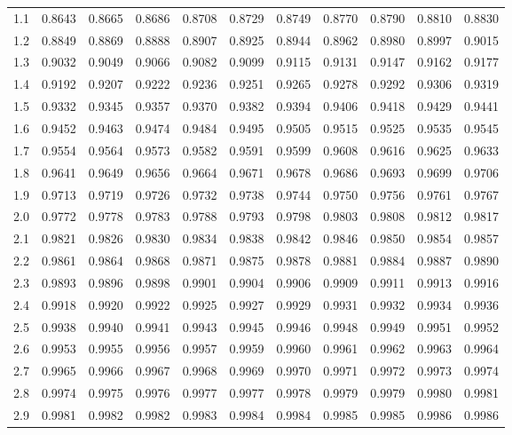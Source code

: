 \documentclass[12pt,a4paper]{article}
\begin{document}
\begin{enumerate}
\begin{center}
\begin{longtable}{ccccccccccc}
1.1 & 0.8643 & 0.8665 & 0.8686 & 0.8708 & 0.8729 & 0.8749 & 0.8770 & 0.8790 & 0.8810 & 0.8830 \\
1.2 & 0.8849 & 0.8869 & 0.8888 & 0.8907 & 0.8925 & 0.8944 & 0.8962 & 0.8980 & 0.8997 & 0.9015 \\
1.3 & 0.9032 & 0.9049 & 0.9066 & 0.9082 & 0.9099 & 0.9115 & 0.9131 & 0.9147 & 0.9162 & 0.9177 \\
1.4 & 0.9192 & 0.9207 & 0.9222 & 0.9236 & 0.9251 & 0.9265 & 0.9278 & 0.9292 & 0.9306 & 0.9319 \\
1.5 & 0.9332 & 0.9345 & 0.9357 & 0.9370 & 0.9382 & 0.9394 & 0.9406 & 0.9418 & 0.9429 & 0.9441 \\
1.6 & 0.9452 & 0.9463 & 0.9474 & 0.9484 & 0.9495 & 0.9505 & 0.9515 & 0.9525 & 0.9535 & 0.9545 \\
1.7 & 0.9554 & 0.9564 & 0.9573 & 0.9582 & 0.9591 & 0.9599 & 0.9608 & 0.9616 & 0.9625 & 0.9633 \\
1.8 & 0.9641 & 0.9649 & 0.9656 & 0.9664 & 0.9671 & 0.9678 & 0.9686 & 0.9693 & 0.9699 & 0.9706 \\
1.9 & 0.9713 & 0.9719 & 0.9726 & 0.9732 & 0.9738 & 0.9744 & 0.9750 & 0.9756 & 0.9761 & 0.9767 \\
2.0 & 0.9772 & 0.9778 & 0.9783 & 0.9788 & 0.9793 & 0.9798 & 0.9803 & 0.9808 & 0.9812 & 0.9817 \\
2.1 & 0.9821 & 0.9826 & 0.9830 & 0.9834 & 0.9838 & 0.9842 & 0.9846 & 0.9850 & 0.9854 & 0.9857 \\
2.2 & 0.9861 & 0.9864 & 0.9868 & 0.9871 & 0.9875 & 0.9878 & 0.9881 & 0.9884 & 0.9887 & 0.9890 \\
2.3 & 0.9893 & 0.9896 & 0.9898 & 0.9901 & 0.9904 & 0.9906 & 0.9909 & 0.9911 & 0.9913 & 0.9916 \\
2.4 & 0.9918 & 0.9920 & 0.9922 & 0.9925 & 0.9927 & 0.9929 & 0.9931 & 0.9932 & 0.9934 & 0.9936 \\
2.5 & 0.9938 & 0.9940 & 0.9941 & 0.9943 & 0.9945 & 0.9946 & 0.9948 & 0.9949 & 0.9951 & 0.9952 \\
2.6 & 0.9953 & 0.9955 & 0.9956 & 0.9957 & 0.9959 & 0.9960 & 0.9961 & 0.9962 & 0.9963 & 0.9964 \\
2.7 & 0.9965 & 0.9966 & 0.9967 & 0.9968 & 0.9969 & 0.9970 & 0.9971 & 0.9972 & 0.9973 & 0.9974 \\
2.8 & 0.9974 & 0.9975 & 0.9976 & 0.9977 & 0.9977 & 0.9978 & 0.9979 & 0.9979 & 0.9980 & 0.9981 \\
2.9 & 0.9981 & 0.9982 & 0.9982 & 0.9983 & 0.9984 & 0.9984 & 0.9985 & 0.9985 & 0.9986 & 0.9986 \\

\end{longtable}
\end{center}
\end{enumerate}
\end{document}
